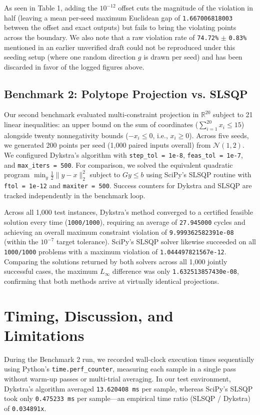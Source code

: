 \documentclass[11pt,a4paper]{article}
\begin{document}
As seen in Table 1, adding the $10^{-12}$ offset cuts the magnitude of the violation in half (leaving a mean per-seed maximum Euclidean gap of \texttt{1.667006818003} between the offset and exact outputs) but fails to bring the violating points across the boundary. We also note that a raw violation rate of \texttt{74.72\%} $\pm$ \texttt{0.83\%} mentioned in an earlier unverified draft could not be reproduced under this seeding setup (where one random direction $g$ is drawn per seed) and has been discarded in favor of the logged figures above.

\subsection{Benchmark 2: Polytope Projection vs. SLSQP}
Our second benchmark evaluated multi-constraint projection in $\mathbb{R}^{20}$ subject to 21 linear inequalities: an upper bound on the sum of coordinates ($\sum_{i=1}^{20} x_i \le 15$) alongside twenty nonnegativity bounds ($-x_i \le 0$, i.e., $x_i \ge 0$). Across five seeds, we generated 200 points per seed (1,000 paired inputs overall) from $\mathcal{N}(1, 2)$. We configured Dykstra's algorithm with \texttt{step\_tol = 1e-8}, \texttt{feas\_tol = 1e-7}, and \texttt{max\_iters = 500}. For comparison, we solved the equivalent quadratic program $\min_y \frac{1}{2} \|y - x\|_2^2$ subject to $G y \le b$ using SciPy's SLSQP routine with \texttt{ftol = 1e-12} and \texttt{maxiter = 500}. Success counters for Dykstra and SLSQP are tracked independently in the benchmark loop.

Across all 1,000 test instances, Dykstra's method converged to a certified feasible solution every time (\texttt{1000/1000}), requiring an average of \texttt{27.945000} cycles and achieving an overall maximum constraint violation of \texttt{9.999362582391e-08} (within the $10^{-7}$ target tolerance). SciPy's SLSQP solver likewise succeeded on all \texttt{1000/1000} problems with a maximum violation of \texttt{1.044497821567e-12}. Comparing the solutions returned by both solvers across all 1,000 jointly successful cases, the maximum $L_\infty$ difference was only \texttt{1.632513857430e-08}, confirming that both methods arrive at virtually identical projections.

\section{Timing, Discussion, and Limitations}

During the Benchmark 2 run, we recorded wall-clock execution times sequentially using Python's \texttt{time.perf\_counter}, measuring each sample in a single pass without warm-up passes or multi-trial averaging. In our test environment, Dykstra's algorithm averaged \texttt{13.620408 ms} per sample, whereas SciPy's SLSQP took only \texttt{0.475233 ms} per sample---an empirical time ratio (SLSQP / Dykstra) of \texttt{0.034891x}.
\end{document}
